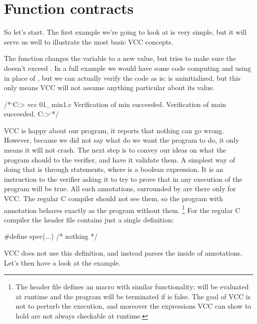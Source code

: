 \section{Function contracts}

So let's start.
The first example we're going to look at is very simple, but it will serve
us well to illustrate the most basic VCC concepts.


\noindent
The  function changes the variable  to a new
value, but tries to make sure the  doesn't exceed .
In a full example we would have some code computing 
and using  in place of , but we can actually
verify the code as is:  is uninitialized,
but this only means
VCC will not assume anything particular about its value.

\begin{VCC}
/*`C:\somewhere> vcc 01_min1.c
Verification of min succeeded.
Verification of main succeeded.
C:\somewhere>`*/
\end{VCC}

\noindent
VCC is happy about our program, it reports that nothing can go wrong.
However, because we did not say what do we want the program to do,
it only means it will not crash.
The next step is to convey our ideas on what the program should
to the verifier, and have it validate them.
A simplest way of doing that is through 
statements, where  is a boolean expression.
It is an instruction to the verifier asking it to try to prove
that in any execution of the program  will be true.
All such annotations, surrounded by 
are there only for VCC.
The regular C compiler should not see them,
so the program with annotation behaves exactly as the program
without them.
\footnote{
  The  header file defines an 
  macro with similar functionality:  will be evaluated
  at runtime and the program will be terminated if  is false.
  The goal of VCC is not to perturb the execution,
  and moreover the expressions VCC can show to hold are not always
  checkable at runtime.
}
For the regular C compiler the  header file contains
just a single definition:
\begin{VCC}
#define spec(...) /* nothing */
\end{VCC}
VCC does not use this definition, and instead parses the inside of 
annotations.
Let's then have a look at the example.

